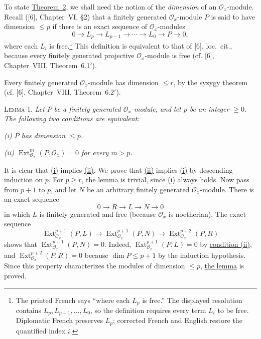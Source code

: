 To state \hyperref[fac:III:5:no:74:thm:2]{Theorem~2}, we shall need the notion of the \textit{dimension}
of an $\mathcal O_x$-module. Recall ([6], Chapter~VI, \S2) that a
finitely generated $\mathcal O_x$-module $P$ is said to have dimension
$\leq p$ if there is an exact sequence of $\mathcal O_x$-modules
\label{fac:III:5:no:74:def:dimension}
\[
0\longrightarrow L_p\longrightarrow L_{p-1}\longrightarrow\cdots
\longrightarrow L_0\longrightarrow P\longrightarrow0,
\]
where each $L_i$ is free.\footnote{The printed French says ``where each
$L_p$ is free.'' The displayed resolution contains
$L_p,L_{p-1},\ldots,L_0$, so the definition requires every term $L_i$
to be free. Diplomatic French preserves $L_p$; corrected French and
English restore the quantified index $i$.} This definition is
equivalent to that of [6], loc.~cit., because every finitely generated
projective $\mathcal O_x$-module is free (cf. [6], Chapter~VIII,
Theorem~6.1$'$).

\label{fac:III:5:no:74:syzygy-bound}
Every finitely generated $\mathcal O_x$-module has dimension $\leq r$,
by the syzygy theorem (cf. [6], Chapter~VIII, Theorem~6.2$'$).

\label{fac:III:5:no:74:lemma:1}
\textsc{Lemma 1.} \textit{Let $P$ be a finitely generated
$\mathcal O_x$-module, and let $p$ be an integer $\geq0$. The following
two conditions are equivalent:}

\label{fac:III:5:no:74:lemma:1:i}
\textit{(i) $P$ has dimension $\leq p$.}

\label{fac:III:5:no:74:lemma:1:ii}
\textit{(ii) $\operatorname{Ext}_{\mathcal O_x}^m(P,\mathcal O_x)=0$
for every $m>p$.}

It is clear that \hyperref[fac:III:5:no:74:lemma:1:i]{(i)} implies
\hyperref[fac:III:5:no:74:lemma:1:ii]{(ii)}. We prove that
\hyperref[fac:III:5:no:74:lemma:1:ii]{(ii)} implies
\hyperref[fac:III:5:no:74:lemma:1:i]{(i)} by
descending induction on $p$. For $p\geq r$, the lemma is trivial,
since \hyperref[fac:III:5:no:74:lemma:1:i]{(i)} always holds. Now pass from $p+1$ to $p$, and let $N$ be an
arbitrary finitely generated $\mathcal O_x$-module. There is an exact
sequence
\[
0\longrightarrow R\longrightarrow L\longrightarrow N\longrightarrow0
\]
in which $L$ is finitely generated and free (because $\mathcal O_x$ is
noetherian). The exact sequence
\label{fac:III:5:no:74:formula:Ext-segment}
\[
\operatorname{Ext}_{\mathcal O_x}^{p+1}(P,L)
\longrightarrow\operatorname{Ext}_{\mathcal O_x}^{p+1}(P,N)
\longrightarrow\operatorname{Ext}_{\mathcal O_x}^{p+2}(P,R)
\]
shows that $\operatorname{Ext}_{\mathcal O_x}^{p+1}(P,N)=0$.
Indeed, $\operatorname{Ext}_{\mathcal O_x}^{p+1}(P,L)=0$ by
\hyperref[fac:III:5:no:74:lemma:1:ii]{condition (ii)}, and
$\operatorname{Ext}_{\mathcal O_x}^{p+2}(P,R)=0$ because
$\dim P\leq p+1$ by the induction hypothesis. Since this property
characterizes the modules of dimension $\leq p$,
\hyperref[fac:III:5:no:74:lemma:1]{the lemma} is proved.

